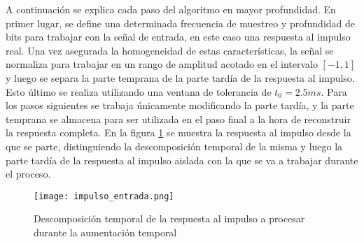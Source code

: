 A continuación se explica cada paso del algoritmo en mayor profundidad.
En primer lugar, se define una determinada frecuencia de muestreo y profundidad de bits para trabajar con la señal de entrada, en este caso una respuesta al impulso real. Una vez asegurada la homogeneidad de estas características, la señal se normaliza para trabajar en un rango de amplitud acotado en el intervalo $[-1,1]$ y luego se separa la parte temprana de la parte tardía de la respuesta al impulso. Esto último se realiza utilizando una ventana de tolerancia de $t_{0} = 2.5 ms$. Para los pasos siguientes se trabaja únicamente modificando la parte tardía, y la parte temprana se almacena para ser utilizada en el paso final a la hora de reconstruir la respuesta completa. En la figura \ref{fig:impulso_entrada} se  muestra la respuesta al impulso desde la que se parte, distinguiendo la descomposición temporal de la misma y luego la parte tardía de la respuesta al impulso aislada con la que se va a trabajar durante el proceso.

\begin{figure}[H]
	\centering{}
	\texttt{[image: impulso\_entrada.png]}
	\caption{Descomposición temporal de la respuesta al impulso a procesar durante la aumentación temporal}
	\label{fig:impulso_entrada}
\end{figure}

